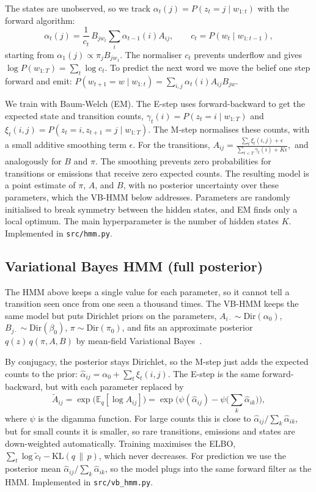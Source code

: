 \documentclass[11pt]{article}
\begin{document}
The states are unobserved, so we track
$\alpha_t(j) = P(z_t = j \mid w_{1:t})$ with the forward algorithm:
\[
\alpha_t(j) = \frac{1}{c_t}\, B_{j w_t} \sum_i \alpha_{t-1}(i) A_{ij},
\qquad c_t = P(w_t \mid w_{1:t-1}),
\]
starting from $\alpha_1(j) \propto \pi_j B_{j w_1}$. The normaliser $c_t$
prevents underflow and gives $\log P(w_{1:T}) = \sum_t \log c_t$. To
predict the next word we move the belief one step forward and emit:
$P(w_{t+1} = w \mid w_{1:t}) = \sum_{i,j} \alpha_t(i) A_{ij} B_{jw}$.

We train with Baum-Welch (EM). The E-step uses forward-backward to get
the expected state and transition counts,
$\gamma_t(i) = P(z_t = i \mid w_{1:T})$ and
$\xi_t(i,j) = P(z_t = i, z_{t+1} = j \mid w_{1:T})$. The M-step normalises
these counts, with a small additive smoothing term $\epsilon$. For the transitions,
\(
A_{ij} = \frac{\sum_t \xi_t(i,j) + \epsilon}{\sum_{t<T} \gamma_t(i) + K\epsilon},
\)
and analogously for $B$ and $\pi$. The smoothing prevents zero
probabilities for transitions or emissions that receive zero expected
counts. The resulting model is a point estimate of $\pi$, $A$, and $B$,
with no posterior uncertainty over these parameters, which the VB-HMM
below addresses.
Parameters are randomly initialised to break symmetry between the
hidden states, and EM finds only a local optimum. 
The main hyperparameter is the number of hidden states $K$. Implemented in \texttt{src/hmm.py}.

\subsection{Variational Bayes HMM (full posterior)}

The HMM above keeps a single value for each parameter, so it cannot tell
a transition seen once from one seen a thousand times. The VB-HMM keeps
the same model but puts Dirichlet priors on the parameters,
$A_{i\cdot} \sim \text{Dir}(\alpha_0)$, $B_{j\cdot} \sim \text{Dir}(\beta_0)$,
$\pi \sim \text{Dir}(\pi_0)$, and fits an approximate posterior
$q(z)\,q(\pi, A, B)$ by mean-field Variational Bayes~\cite{beal2003,bishop2006}.

By conjugacy, the posterior stays Dirichlet, so the M-step just adds the
expected counts to the prior:
$\hat\alpha_{ij} = \alpha_0 + \sum_t \xi_t(i,j)$. The E-step is the same
forward-backward, but with each parameter replaced by
\[
\widetilde{A}_{ij} = \exp\big(\mathbb{E}_q[\log A_{ij}]\big)
= \exp\Big(\psi(\hat\alpha_{ij}) - \psi\big(\textstyle\sum_k \hat\alpha_{ik}\big)\Big),
\]
where $\psi$ is the digamma function. For large counts this is close to
$\hat\alpha_{ij} / \sum_k \hat\alpha_{ik}$, but for small counts it is
smaller, so rare transitions,
emissions and states are down-weighted automatically. Training maximises
the ELBO, $\sum_t \log \widetilde{c}_t - \mathrm{KL}(q \,\|\, p)$, which
never decreases.
For prediction we use the posterior mean
$\hat\alpha_{ij} / \sum_k \hat\alpha_{ik}$, so the model plugs into the
same forward filter as the HMM. 
Implemented in \texttt{src/vb\_hmm.py}.
\end{document}
